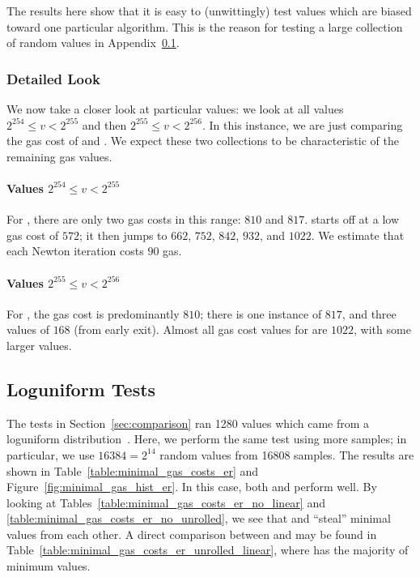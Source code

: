 The results here show that it is easy to (unwittingly)
test values which are biased toward one particular algorithm.
This is the reason for testing a large collection
of random values in Appendix~\ref{app:loguniform}.

\subsubsection{Detailed Look}
\label{app:deterministic_detailed}

We now take a closer look at particular values:
we look at all values $2^{254} \le v < 2^{255}$
and then $2^{255} \le v < 2^{256}$.
In this instance, we are just comparing the gas cost of \UnrolledThree{}
and \WhileOne{}.
We expect these two collections to be characteristic
of the remaining gas values.

\paragraph{Values $2^{254} \le v < 2^{255}$}
For \UnrolledThree{}, there are only two gas costs in this range:
$810$ and $817$.
\WhileOne{} starts off at a low gas cost of $572$;
it then jumps to $662$, $752$, $842$, $932$, and $1022$.
We estimate that each Newton iteration costs $90$ gas.

\paragraph{Values $2^{255} \le v < 2^{256}$}
For \UnrolledThree{}, the gas cost is predominantly $810$;
there is one instance of $817$, and three values of $168$ (from early exit).
Almost all gas cost values for \WhileOne{} are $1022$,
with some larger values.




\subsection{Loguniform Tests}
\label{app:loguniform}

The tests in Section~\ref{sec:comparison} ran 1280 values
which came from a loguniform distribution~\cite{ScipyLoguniform}.
Here, we perform the same test using more samples;
in particular, we use $16384 = 2^{14}$ random values from 16808 samples.
The results are shown in Table~\ref{table:minimal_gas_costs_er}
and Figure~\ref{fig:minimal_gas_hist_er}.
In this case, both \UnrolledThree{} and \Linear{} perform well.
By looking at Tables~\ref{table:minimal_gas_costs_er_no_linear} and
\ref{table:minimal_gas_costs_er_no_unrolled},
we see that \UnrolledThree{} and \Linear{} ``steal''
minimal values from each other.
A direct comparison between \UnrolledThree{} and \Linear{}
may be found in Table~\ref{table:minimal_gas_costs_er_unrolled_linear},
where \UnrolledThree{} has the majority of minimum values.

